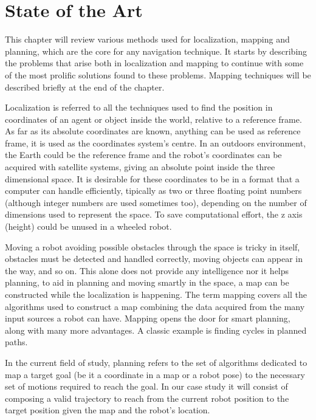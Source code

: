 \chapter{State of the Art} \label{ch_3:chapter}

  This chapter will review various methods used for localization, mapping and planning, which are the core for any navigation technique. It starts by describing the problems that arise both in localization and mapping to continue with some of the most prolific solutions found to these problems. Mapping techniques will be described briefly at the end of the chapter. 

  Localization is referred to all the techniques used to find the position in coordinates of an agent or object inside the world, relative to a reference frame. As far as its absolute coordinates are known, anything can be used as reference frame, it is used as the coordinates system's centre. In an outdoors environment, the Earth could be the reference frame and the robot's coordinates can be acquired with satellite systems, giving an absolute point inside the three dimensional space. It is desirable for these coordinates to be in a format that a computer can handle efficiently, tipically as two or three floating point numbers (although integer numbers are used sometimes too), depending on the number of dimensions used to represent the space. To save computational effort, the z axis (height) could be unused in a wheeled robot.

  Moving a robot avoiding possible obstacles through the space is tricky in itself, obstacles must be detected and handled correctly, moving objects can appear in the way, and so on. This alone does not provide any intelligence nor it helps planning, to aid in planning and moving smartly in the space, a map can be constructed while the localization is happening. The term mapping covers all the algorithms used to construct a map combining the data acquired from the many input sources a robot can have. Mapping opens the door for smart planning, along with many more advantages. A classic example is finding cycles in planned paths.
  
  In the current field of study, planning refers to the set of algorithms dedicated to map a target goal (be it a coordinate in a map or a robot pose) to the necessary set of motions required to reach the goal. In our case study it will consist of composing a valid trajectory to reach from the current robot position to the target position given the map and the robot's location.

